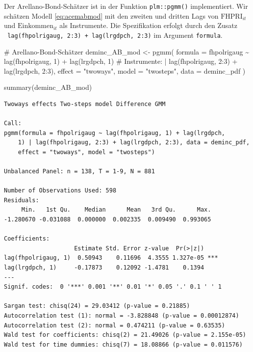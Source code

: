 \documentclass[
  a4paper,
  DIV=11,
  oneside]{scrreprt}
\newenvironment{Shaded}{\begin{snugshade}}{\end{snugshade}}
\newcommand{\AttributeTok}[1]{\textcolor[rgb]{0.40,0.45,0.13}{#1}}
\newcommand{\CommentTok}[1]{\textcolor[rgb]{0.37,0.37,0.37}{#1}}
\newcommand{\DecValTok}[1]{\textcolor[rgb]{0.68,0.00,0.00}{#1}}
\newcommand{\FunctionTok}[1]{\textcolor[rgb]{0.28,0.35,0.67}{#1}}
\newcommand{\NormalTok}[1]{\textcolor[rgb]{0.00,0.23,0.31}{#1}}
\newcommand{\OtherTok}[1]{\textcolor[rgb]{0.00,0.23,0.31}{#1}}
\newcommand{\SpecialCharTok}[1]{\textcolor[rgb]{0.37,0.37,0.37}{#1}}
\newcommand{\StringTok}[1]{\textcolor[rgb]{0.13,0.47,0.30}{#1}}
\begin{document}
Der Arellano-Bond-Schätzer ist in der Funktion \texttt{plm::pgmm()}
implementiert. Wir schätzen Modell \eqref{eq:acemabmod} mit den zweiten
und dritten Lags von \(\text{FHPRI}_{it}\) und \(\text{Einkommen}_{it}\)
als Instrumente. Die Spezifikation erfolgt durch den Zusatz
\texttt{\textbar{}\ lag(fhpolrigaug,\ 2:3)\ +\ lag(lrgdpch,\ 2:3)} im
Argument \texttt{formula}.

\begin{Shaded}
\begin{Highlighting}[]
\CommentTok{\# Arellano{-}Bond{-}Schätzer}
\NormalTok{deminc\_AB\_mod }\OtherTok{\textless{}{-}} \FunctionTok{pgmm}\NormalTok{(}
  \AttributeTok{formula =} 
\NormalTok{    fhpolrigaug }\SpecialCharTok{\textasciitilde{}} 
    \FunctionTok{lag}\NormalTok{(fhpolrigaug, }\DecValTok{1}\NormalTok{) }
  \SpecialCharTok{+} \FunctionTok{lag}\NormalTok{(lrgdpch, }\DecValTok{1}\NormalTok{) }
  \CommentTok{\# Instrumente:}
  \SpecialCharTok{|} \FunctionTok{lag}\NormalTok{(fhpolrigaug, }\DecValTok{2}\SpecialCharTok{:}\DecValTok{3}\NormalTok{)}
  \SpecialCharTok{+} \FunctionTok{lag}\NormalTok{(lrgdpch, }\DecValTok{2}\SpecialCharTok{:}\DecValTok{3}\NormalTok{),}
    \AttributeTok{effect =} \StringTok{"twoways"}\NormalTok{, }
    \AttributeTok{model =} \StringTok{"twosteps"}\NormalTok{,}
    \AttributeTok{data =}\NormalTok{ deminc\_pdf}
\NormalTok{) }

\FunctionTok{summary}\NormalTok{(deminc\_AB\_mod)}
\end{Highlighting}
\end{Shaded}

\begin{verbatim}
Twoways effects Two-steps model Difference GMM 

Call:
pgmm(formula = fhpolrigaug ~ lag(fhpolrigaug, 1) + lag(lrgdpch, 
    1) | lag(fhpolrigaug, 2:3) + lag(lrgdpch, 2:3), data = deminc_pdf, 
    effect = "twoways", model = "twosteps")

Unbalanced Panel: n = 138, T = 1-9, N = 881

Number of Observations Used: 598
Residuals:
     Min.   1st Qu.    Median      Mean   3rd Qu.      Max. 
-1.280670 -0.031088  0.000000  0.002335  0.009490  0.993065 

Coefficients:
                    Estimate Std. Error z-value  Pr(>|z|)    
lag(fhpolrigaug, 1)  0.50943    0.11696  4.3555 1.327e-05 ***
lag(lrgdpch, 1)     -0.17873    0.12092 -1.4781    0.1394    
---
Signif. codes:  0 '***' 0.001 '**' 0.01 '*' 0.05 '.' 0.1 ' ' 1

Sargan test: chisq(24) = 29.03412 (p-value = 0.21885)
Autocorrelation test (1): normal = -3.828848 (p-value = 0.00012874)
Autocorrelation test (2): normal = 0.474211 (p-value = 0.63535)
Wald test for coefficients: chisq(2) = 21.49026 (p-value = 2.155e-05)
Wald test for time dummies: chisq(7) = 18.08866 (p-value = 0.011576)
\end{verbatim}
\end{document}
